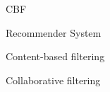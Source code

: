 \documentclass[cic,tc,english]{iiufrgs}
\begin{document}
\listoffigures

\listoftables

\begin{listofabbrv}{CBF}
    \item[RS] Recommender System
    \item[CBF] Content-based filtering
    \item[CF] Collaborative filtering
\end{listofabbrv}


\tableofcontents







\end{document}
